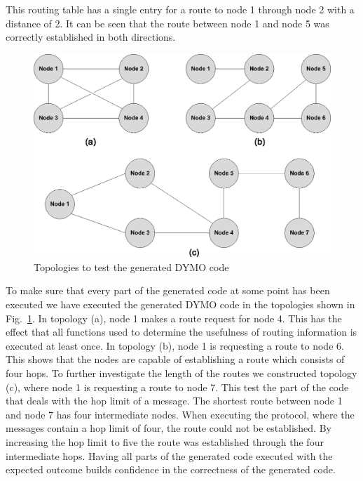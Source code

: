 \noindent This routing table has a single entry for a route to node 1 through node 2 with a distance of 2. It can be seen that the route between node 1 and node 5 was correctly established in both directions. 

\begin{figure}
\centering
\includegraphics[scale=0.8]{dymo/graphics/topologies.eps}
\caption{Topologies to test the generated DYMO code}
\label{fig:topologies}
\end{figure}

To make sure that every part of the generated code at some point has been executed we have executed the generated DYMO code in the topologies shown in Fig.~\ref{fig:topologies}. In topology (a), node 1 makes a route request for node 4. This has the effect that all functions used to determine the usefulness of routing information is executed at least once. In topology (b), node 1 is requesting a route to node 6. This shows that the nodes are capable of establishing a route which consists of four hops. To further investigate the length of the routes we constructed topology (c), where node 1 is requesting a route to node 7. This test the part of the code that deals with the hop limit of a message. The shortest route between node 1 and node 7 has four intermediate nodes. When executing the protocol, where the messages contain a hop limit of four, the route could not be established. By increasing the hop limit to five the route was established through the four intermediate hops. Having all parts of the generated code executed with the expected outcome builds confidence in the correctness of the generated code.
